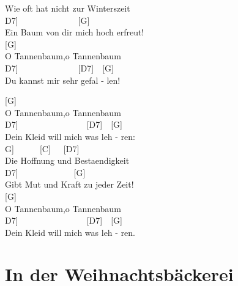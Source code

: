 \documentclass[
  letterpaper,
]{scrbook}
\begin{document}
Wie oft hat nicht zur Winterszeit\\
\hspace*{0.333em}\hspace*{0.333em}\hspace*{0.333em}{[}D7{]}~~~~~~~~~~~~~~{[}G{]}~~~~~\\
Ein Baum von dir mich hoch erfreut!\\
{[}G{]}~~\\
O Tannenbaum,o Tannenbaum\\
\hspace*{0.333em}\hspace*{0.333em}{[}D7{]}~~~~~~~~~~~~~~{[}D7{]}~~{[}G{]}~~~~~\\
Du kannst mir sehr gefal - len!

{[}G{]}~~~~\\
O Tannenbaum,o Tannenbaum\\
\hspace*{0.333em}\hspace*{0.333em}\hspace*{0.333em}\hspace*{0.333em}{[}D7{]}~~~~~~~~~~~~~~~~{[}D7{]}~~{[}G{]}~~~~~\\
Dein Kleid will mich was leh - ren:\\
\hspace*{0.333em}\hspace*{0.333em}\hspace*{0.333em}{[}G{]}~~~~~~{[}C{]}~~~{[}D7{]}~~\\
Die Hoffnung und Bestaendigkeit\\
\hspace*{0.333em}\hspace*{0.333em}\hspace*{0.333em}\hspace*{0.333em}{[}D7{]}~~~~~~~~~~~~~{[}G{]}~~\\
Gibt Mut und Kraft zu jeder Zeit!\\
{[}G{]}~~\\
O Tannenbaum,o Tannenbaum\\
\hspace*{0.333em}\hspace*{0.333em}\hspace*{0.333em}\hspace*{0.333em}{[}D7{]}~~~~~~~~~~~~~~~~{[}D7{]}~~{[}G{]}~~~~~\\
Dein Kleid will mich was leh - ren.

\hypertarget{in-der-weihnachtsbuxe4ckerei}{%
\chapter{In der Weihnachtsbäckerei}\label{in-der-weihnachtsbuxe4ckerei}}
\end{document}
